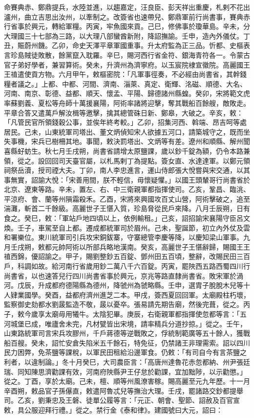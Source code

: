 \begin{pinyinscope}
命賽典赤、鄭鼎提兵，水陸並進，以趨嘉定，汪良臣、彭天祥出重慶，札剌不花出瀘州，曲立吉思出汝州，以牽制之。改簽省也速帶兒、鄭鼎軍前行尚書事，賽典赤行省事於興元，轉給軍糧。丙寅，牢魚國來貢。己巳，修佛事於瓊華島。辛未，分大理國三十七部為三路，以大理八部蠻酋新附，降詔撫諭。壬申，造內外儀仗。丁丑，賑蔚州饑。乙卯，命史天澤平章軍國重事。升太府監為正三品。忻都、史樞表言珍島賊徒敗散，餘黨竄入耽羅。辛巳，賜河西行省金符、銀海青符各一。令蒙古官子弟好學者，兼習算術。癸未，升濟州為濟寧府。以玉宸院棣宣徽院。高麗國王王禃遣使貢方物。六月甲午，敕樞密院：「凡軍事徑奏，不必經由尚書省，其幹錢糧者議之。」上都、中都、河間、濟南、淄萊、真定、衛輝、洺磁、順德、大名、河南、南京、彰德、益都、順天、懷孟、平陽、歸德諸州縣蝗。癸卯，宋將範文虎率蘇劉義、夏松等舟師十萬援襄陽，阿術率諸將迎擊，奪其戰船百餘艘，敵敗走。平章合答又遣萬戶解汝楫等邀擊，擒其總管硃日新、鄭皋，大破之。辛亥，敕：「凡管民官所領錢穀公事，並俟年終考較。」乙卯，招集河西、斡端、昂吉呵等處居民。己未，山東統軍司塔出、董文炳偵知宋人欲據五河口，請築城守之，既而坐失事機，宋兵已樹柵其地。事聞，敕決罰塔出、文炳等有差。遼州和順縣、解州聞喜縣虸蚄生。秋七月壬戌朔，尚書省請增太原鹽課，歲以鈔千錠為額，仍令本路兼領，從之。設回回司天臺官屬，以札馬剌丁為提點。簽女直、水達達軍。以鄭元領祠祭岳瀆，授司禋大夫。丁卯，南人李忠進言，運山侍郎張大悅嘗與宋交通，以其事無實，詔諭大悅：「宋善用間，朕不輕信，毋懷疑懼。」以國王頭輦哥行尚書省於北京、遼東等路。辛未，置左、右、中三衛親軍都指揮使司。乙亥，鞏昌、臨洮、平涼府、會、蘭等州隕霜殺禾。乙酉，宋將來興國攻百丈山營，阿術擊破之，追至湍灘，斬首二千餘級。高麗世子王愖入質，珍島脅從民戶來降。八月壬辰朔，日有食之。癸巳，敕：「軍站戶地四頃以上，依例輸租。」己亥，詔招諭宋襄陽守臣呂文煥。壬子，車駕至自上都。遷成都統軍司於眉州。己未，聖誕節，初立內外仗及雲和署樂位。東川統軍司引兵攻宋銅鈸寨，守寨總管李慶等降，以慶知梁山軍事。九月壬戌朔，敕都元帥阿術以所部兵略地漢南。癸亥，高麗世子王愖辭歸，賜國王王禃西錦，優詔諭之。甲子，賜劉整鈔五百錠、鄧州田五百頃，整辭，改賜民田三百戶，科調如故。給河南行省歲用鈔二萬八千六百錠。丙寅，罷陜西五路西蜀四川行尚書省，以也速答兒行四川尚書省事於興元，京兆等路直隸尚書省。敗宋軍於渦河。戊辰，升成都府德陽縣為德州，降虢州為虢略縣。壬申，選胄子脫脫木兒等十人肄業國學。癸酉，益都府濟州進芝二本。甲戌，簽西夏回回軍。太廟殿柱朽壞，監察御史劾都水劉晸監造不敬，晸以憂卒。張易請先期告廟，然後完葺，從之。丙子，敕今歲享太廟毋用犧牛。太陰犯畢。庚辰，右衛親軍都指揮使忽都等言：「五河城堡已成，唯廬舍未完，凡材甓皆出宋境，請率精兵分道抄掠。」從之。壬午，山東路統軍司言宋兵攻膠州，千戶蔣德等逆戰敗之，俘統制範廣等五十餘人，獲戰船百艘。癸未，詔忙安倉失陷米五千餘石，特免征，仍禁諸王非理需索。詔以四川民力困弊，免茶鹽等課稅，以軍民田租給沿邊軍食。仍敕：「有司自今有言茶鹽之利者，以違制論。」冬十月癸巳，大司農臣言：「高唐州達魯花赤忽都納、州尹張廷瑞、同知陳思濟勸課有效，河南府陜縣尹王仔怠於勸課，宜加黜陟，以示勸懲。」從之。丁酉，享於太廟。己未，檀、順等州風潦害稼。賜高麗至元九年歷。十一月辛酉朔，敕品官子孫儤直，敕遣阿魯忒兒等撫治大理。壬戌，罷諸路交鈔都提舉司。乙亥，劉秉忠及王磐、徒單公履等言：「元正、朝會、聖節、詔赦及百官宣敕，具公服迎拜行禮。」從之。禁行金《泰和律》。建國號曰大元，詔曰：




\end{pinyinscope}
